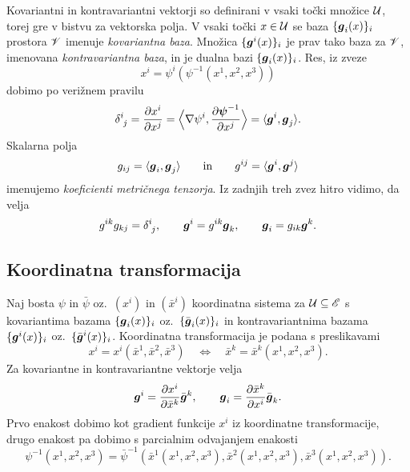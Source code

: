 Kovariantni in kontravariantni vektorji so definirani v vsaki točki množice $\mathcal U$, torej
gre v bistvu za vektorska polja. V vsaki točki $x\in \mathcal U$ se baza $\{\boldsymbol g_i(x)\}_i$ prostora $\mathscr V$
imenuje \emph{kovariantna baza}.
Množica $\{\boldsymbol g^i(x)\}_i$ je prav tako baza za $\mathscr V$, imenovana \emph{kontravariantna baza},
in je dualna bazi $\{\boldsymbol g_i(x)\}_i$. Res, iz zveze
\[ x^i=\psi^i(\psi^{-1}(x^1,x^2,x^3)) \]
dobimo po verižnem pravilu
\begin{equation} \label{e:gigj}
	\topbot{\delta}{i}{j}=\frac{\partial x^i}{\partial x^j}=
	\Big<\nabla\psi^i,\frac{\partial\vek{\psi}^{-1}}{\partial x^j}\Big>=\langle\vek{g}^i,\vek{g}_j\rangle.
\end{equation}
Skalarna polja
\[ g_{ij}=\langle\boldsymbol g_i,\boldsymbol g_j\rangle\qquad\textrm{in}\qquad g^{ij}=\langle\boldsymbol g^i,\boldsymbol g^j\rangle \]
imenujemo \emph{koeficienti metričnega tenzorja}. 
Iz zadnjih treh zvez hitro vidimo, da velja
\begin{equation*} %
	g^{ik}g_{kj}=\topbot{\delta}{i}{j},\qquad \vek{g}^i=g^{ik}\vek{g}_k,\qquad \vek{g}_i=g_{ik}\vek{g}^k.
\end{equation*}


\subsection{Koordinatna transformacija}


Naj bosta $\psi$ in $\bar{\psi}$ oz.~$(x^i)$ in $(\bar{x}^i)$ koordinatna sistema za
$\mathcal U\subseteq\mathscr E$ s kovariantima bazama $\{\boldsymbol g_i(x)\}_i$ oz.~$\{\bar{\boldsymbol g}_i(x)\}_i$
in kontravariantnima bazama $\{\boldsymbol g^i(x)\}_i$ oz.~$\{\bar{\boldsymbol g}^i(x)\}_i$.
Koordinatna transformacija je podana s preslikavami
\[
	x^i=x^i(\bar{x}^1,\bar{x}^2,\bar{x}^3)\quad\Longleftrightarrow\quad
	\bar{x}^k=\bar{x}^k(x^1,x^2,x^3).
\]
Za kovariantne in kontravariantne vektorje velja
\begin{equation} \label{e:gtog}
	\boldsymbol g^i=\frac{\partial x^i}{\partial\bar{x}^k}\bar{\boldsymbol g}^k,\qquad
	\boldsymbol g_i=\frac{\partial\bar{x}^k}{\partial x^i}\bar{\boldsymbol g}_k.
\end{equation}
Prvo enakost dobimo kot gradient funkcije $x^i$ iz koordinatne transformacije,
drugo enakost pa dobimo s parcialnim odvajanjem enakosti
\[ 
	\psi^{-1}(x^1,x^2,x^3)=\bar{\psi}^{-1}(\bar{x}^1(x^1,x^2,x^3),
	\bar{x}^2(x^1,x^2,x^3),\bar{x}^3(x^1,x^2,x^3)).
\]

